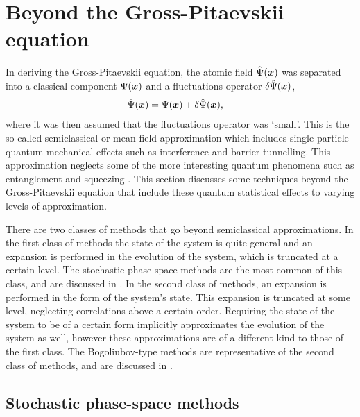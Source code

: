 \section{Beyond the Gross-Pitaevskii equation}
\label{BackgroundTheory:BeyondGrossPitaevskii}

In deriving the Gross-Pitaevskii equation, the atomic field $\hat{\Psi}(\bm{x})$ was separated into a classical component $\Psi(\bm{x})$ and a fluctuations operator $\delta\hat{\Psi}(\bm{x})$,
\begin{align}
    \hat{\Psi}(\bm{x}) &= \Psi(\bm{x}) + \delta\hat{\Psi}(\bm{x}),
\end{align}
where it was then assumed that the fluctuations operator was `small'.  This is the so-called semiclassical or mean-field approximation which includes single-particle quantum mechanical effects such as interference and barrier-tunnelling.  This approximation neglects some of the more interesting quantum phenomena such as entanglement and squeezing \citep{Scully}.  This section discusses some techniques beyond the Gross-Pitaevskii equation that include these quantum statistical effects to varying levels of approximation.  

There are two classes of methods that go beyond semiclassical approximations.  In the first class of methods the state of the system is quite general and an expansion is performed in the evolution of the system, which is truncated at a certain level.  The stochastic phase-space methods are the most common of this class, and are discussed in  .  In the second class of methods, an expansion is performed in the form of the system's state.  This expansion is truncated at some level, neglecting correlations above a certain order.  Requiring the state of the system to be of a certain form implicitly approximates the evolution of the system as well, however these approximations are of a different kind to those of the first class.  The Bogoliubov-type methods are representative of the second class of methods, and are discussed in .



\subsection{Stochastic phase-space methods}
\label{BackgroundTheory:StochasticPhaseSpaceMethods}

